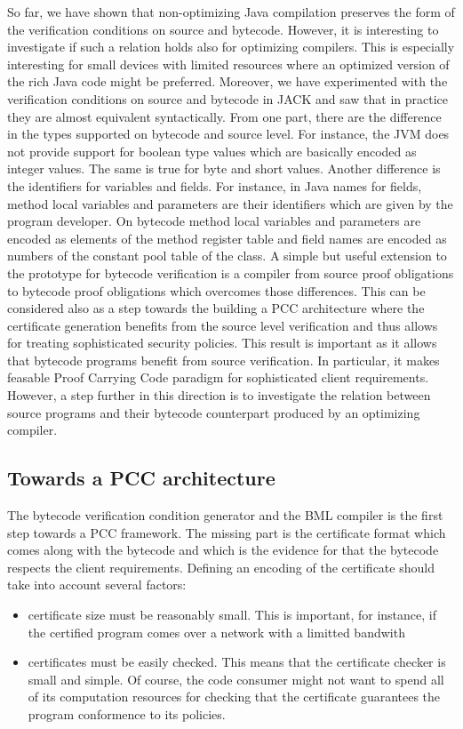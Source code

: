 So far, we have shown that non-optimizing Java compilation
 preserves the  form of the verification conditions on source and
 bytecode. However, it is interesting to investigate if such a relation  holds also  for
 optimizing compilers. This is especially  interesting for small devices with limited resources
  where an optimized version of the rich Java code might be preferred. 
Moreover, we have experimented with the verification conditions on source and
 bytecode in JACK and saw that in practice they are almost equivalent
 syntactically. From one part, there are the difference in the types 
 supported on bytecode and source level. For instance, the JVM does not
 provide support for boolean type values which are basically encoded as
 integer values. The same is true for byte and short values.  Another
 difference is the identifiers for variables and fields. For instance, in Java
 names for fields, method local variables and parameters are their identifiers which are given by the
 program developer. On bytecode method local variables and parameters are encoded as elements of the
 method register table and field names are encoded as numbers of the constant
 pool table of the class. A  simple but useful extension to the prototype for
 bytecode verification is a compiler from source proof obligations to bytecode proof obligations
 which overcomes those differences. This can be considered also as a step
 towards the  building a PCC architecture where the certificate generation benefits from
 the source level verification and thus allows for treating sophisticated
 security policies.
This result is important as it allows that bytecode programs  benefit from source verification. In particular, it makes
feasable Proof Carrying Code paradigm for sophisticated client requirements. However, a step further in this direction is to investigate the 
relation between source programs and their bytecode counterpart produced by an optimizing compiler. 


\subsection{Towards a PCC architecture}

The bytecode verification condition generator and the BML compiler is the first step towards a PCC framework. 
The missing  part is  the certificate format which comes along with the bytecode and which  is the evidence for 
that the bytecode respects the client requirements. Defining an encoding of the certificate should take into account several factors:
\begin{itemize} 
  \item certificate size must be reasonably small. This is important, for instance,  if the certified program comes over a network with a limitted bandwith
  \item certificates must be easily checked. This means that the certificate checker is  small and simple.
	       Of course, the code consumer might not want to spend all of its computation 
	      resources for checking that the certificate guarantees the program conformence to its policies.     
\end{itemize}

